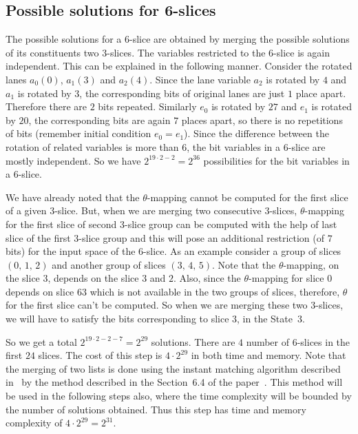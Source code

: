 \subsection{Possible solutions for  6-slices}
The possible solutions for a $6$-slice are obtained by merging the possible solutions of its constituents two $3$-slices. The variables restricted to the $6$-slice is again independent. This can be explained in the following manner. Consider the rotated lanes $a_0(0)$, $a_1(3)$ and $a_2(4)$. Since the lane variable $a_2$ is rotated by $4$ and $a_1$ is rotated by $3$, the corresponding bits of original lanes are just $1$ place apart. Therefore there are $2$ bits repeated. Similarly $e_0$ is rotated by $27$ and $e_1$ is rotated by $20$, the corresponding bits are again $7$ places apart, so there is no repetitions of bits (remember initial condition $e_0 = e_1$). Since the difference between the rotation of related variables is more than $6$, the bit variables in a $6$-slice are mostly independent.
So we have $2^{19\cdot 2 - 2}= 2^{36}$ possibilities for the bit variables in a $6$-slice. 

We have already noted that the $\theta$-mapping cannot be computed for the first slice of a given $3$-slice. But, when we are merging two consecutive $3$-slices, $\theta$-mapping for the first slice of second $3$-slice group can be computed with the help of last slice of the first $3$-slice group and this will pose an additional restriction (of $7$ bits) for the input space of the $6$-slice.
As an example consider a group of slices $(0,\,1,\,2)$ and another group of slices $(3,\,4,\,5)$. Note that the $\theta$-mapping, on the slice $3$, depends on the slice $3$ and $2$. Also, since the $\theta$-mapping for slice $0$ depends on slice $63$ which is not available in the two groups of slices, therefore, $\theta$ for the first slice can't be computed. So when we are merging these two $3$-slices, we will have to satisfy the bits corresponding to slice $3$, in the State~3. 

So we get a total $2^{19\cdot 2 - 2 - 7} = 2^{29}$ solutions. There are $4$ number of $6$-slices in the first $24$ slices.
The cost of this step is $4 \cdot 2^{29}$ in both time and memory. Note that the merging of two lists is done using the instant matching algorithm described in~\cite{naya2011improve} by the method described in the Section~6.4 of the paper~\cite{naya2011practical}. This method will be used in the following steps also, where the time complexity will be bounded by the number of solutions obtained. Thus this step has time and memory complexity of $4 \cdot 2^{29} = 2^{31}$.

